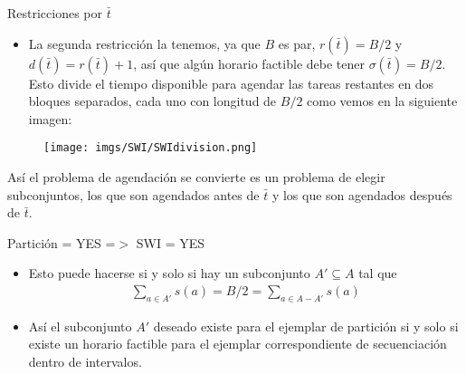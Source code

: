 \begin{frame}{Restricciones por $\bar{t}$}
    \begin{itemize}
        \itemj $\bar{t}$ nos asegura que el horario factible no puede ser construido cuando $B$ es un número impar, porque tendríamos que $r(\bar{t})= d(\bar{t})$. Supongamos que $B=3$ entonces $r(\bar{t})= \lceil 3/2\rceil, d(\bar{t})=\lceil (3+1)/2\rceil => r(\bar{t})= \lceil 1.5\rceil, d(\bar{t})=\lceil 4/2\rceil=> r(\bar{t})= 2, d(\bar{t})=2$ y $\bar{t}$ no puede ser agendada. Así que asumimos que $B$ es par.
        \item La segunda restricción la tenemos, ya que $B$ es par, $r(\bar{t})= B/2$ y $d(\bar{t})=r(\bar{t}) +1$, así que algún horario factible debe tener $\sigma(\bar{t})=B/2$. Esto divide el tiempo disponible para agendar las tareas restantes en dos bloques separados, cada uno con longitud de $B/2$ como vemos en la siguiente imagen:
    \end{itemize}
\end{frame}

\begin{frame}
    \begin{figure}
    \centering
        \texttt{[image: imgs/SWI/SWIdivision.png]}
    \end{figure}
    Así el problema de agendación se convierte es un problema de elegir subconjuntos, los que son agendados antes de $\bar{t}$ y los que son agendados después de $\bar{t}$.
\end{frame}

\begin{frame}{Partición = YES =$>$ SWI = YES}
    \begin{itemize}
        \itemj Como la cantidad total de tiempo disponible en los dos bloques es igual al total de la longitud $B$ de las tareas restantes, tenemos que llenar cada bloque de forma exacta.
        \item Esto puede hacerse si y solo si hay un subconjunto $A'\subseteq A$ tal que
        \begin{align*}
            \sum_{a\in A'} s(a) = B/2 = \sum_{a\in A-A'} s(a)
        \end{align*}
        \item Así el subconjunto $A'$ deseado existe para el ejemplar de partición si y solo si existe un horario factible para el ejemplar correspondiente de secuenciación dentro de intervalos.
    \end{itemize}
\end{frame}

